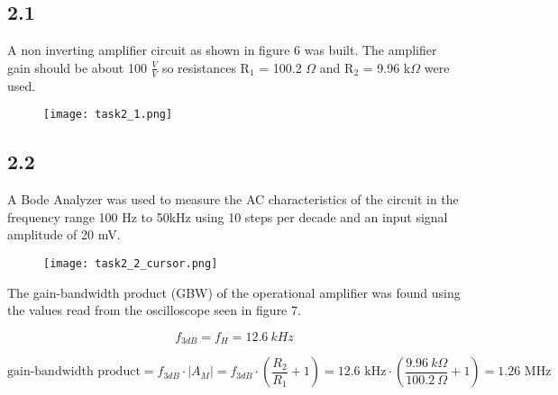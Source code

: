 \subsection*{2.1}

    A non inverting amplifier circuit as shown in figure 6 was built. The amplifier gain should be about 100 $\frac{V}{V}$ so resistances R$_1$ = 100.2 $\Omega$ and R$_2$ = 9.96 k$\Omega$ were used.

    \begin{figure}[h!]
        \centering
        \texttt{[image: task2\_1.png]}
    \end{figure}

\subsection*{2.2}

    A Bode Analyzer was used to measure the AC characteristics of the circuit in the frequency range 100 Hz to 50kHz using 10 steps per decade and an input signal amplitude of 20 mV.\\

    \begin{figure}[h!]
        \centering
        \texttt{[image: task2\_2\_cursor.png]}
    \end{figure}

    The gain-bandwidth product (GBW) of the operational amplifier was found using the values read from the oscilloscope seen in figure 7. 

    $$f_{3dB} = f_{H} = 12.6 \ kHz$$

    $$\text{gain-bandwidth product} = f_{3dB} \cdot |A_M| = f_{3dB} \cdot (\frac{R_2}{R_1} + 1) = 12.6\text{ kHz} \cdot (\frac{9.96\ k \Omega}{100.2\ \Omega} + 1) = 1.26 \text{ MHz}$$

